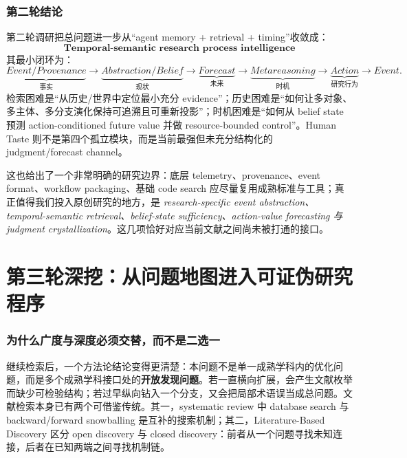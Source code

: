 \documentclass[11pt,a4paper]{ctexart}
\begin{document}
\section{第二轮结论}

第二轮调研把总问题进一步从“agent memory + retrieval + timing”收敛成：
\begin{equation}
\boxed{
\textbf{Temporal-semantic research process intelligence}
}
\end{equation}
其最小闭环为：
\begin{equation}
\boxed{
\underbrace{Event/Provenance}_{事实}
\to
\underbrace{Abstraction/Belief}_{现状}
\to
\underbrace{Forecast}_{未来}
\to
\underbrace{Metareasoning}_{时机}
\to
\underbrace{Action}_{研究行为}
\to Event.
}
\end{equation}
检索困难是“从历史/世界中定位最小充分 evidence”；历史困难是“如何让多对象、多主体、多分支演化保持可追溯且可重新投影”；时机困难是“如何从 belief state 预测 action-conditioned future value 并做 resource-bounded control”。Human Taste 则不是第四个孤立模块，而是当前最强但未充分结构化的 judgment/forecast channel。

这也给出了一个非常明确的研究边界：底层 telemetry、provenance、event format、workflow packaging、基础 code search 应尽量复用成熟标准与工具；真正值得我们投入原创研究的地方，是 \emph{research-specific event abstraction、temporal-semantic retrieval、belief-state sufficiency、action-value forecasting 与 judgment crystallization}。这几项恰好对应当前文献之间尚未被打通的接口。



\part{第三轮深挖：从问题地图进入可证伪研究程序}

\section{为什么广度与深度必须交替，而不是二选一}

继续检索后，一个方法论结论变得更清楚：本问题不是单一成熟学科内的优化问题，而是多个成熟学科接口处的\textbf{开放发现问题}。若一直横向扩展，会产生文献枚举而缺少可检验结构；若过早纵向钻入一个分支，又会把局部术语误当成总问题。文献检索本身已有两个可借鉴传统。其一，systematic review 中 database search 与 backward/forward snowballing 是互补的搜索机制\parencite{wohlin2014snowballing,wohlin2015experiences}；其二，Literature-Based Discovery 区分 open discovery 与 closed discovery：前者从一个问题寻找未知连接，后者在已知两端之间寻找机制链\parencite{henry2017lbd,gopalakrishnan2019lbd}。
\end{document}

